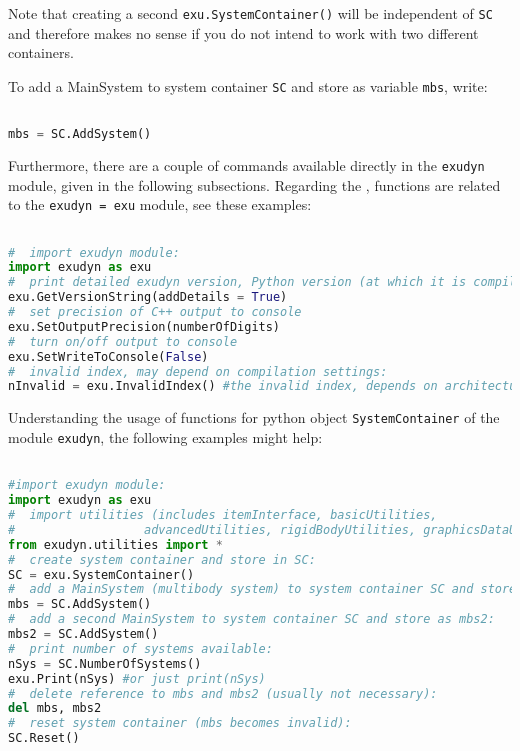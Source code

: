 Note that creating a second \texttt{exu.SystemContainer()} will be independent of \texttt{SC} and therefore makes no sense if you do not intend to work with two different containers.

To add a MainSystem to system container \texttt{SC} and store as variable \texttt{mbs}, write:
\pythonstyle
\begin{lstlisting}[language=Python, firstnumber=1]

mbs = SC.AddSystem()
\end{lstlisting}


Furthermore, there are a couple of commands available directly in the \texttt{exudyn} module, given in the following subsections. Regarding the , functions are related to the \texttt{exudyn = exu} module, see these examples:
\pythonstyle
\begin{lstlisting}[language=Python, firstnumber=1]

#  import exudyn module:
import exudyn as exu
#  print detailed exudyn version, Python version (at which it is compiled):
exu.GetVersionString(addDetails = True)
#  set precision of C++ output to console
exu.SetOutputPrecision(numberOfDigits)
#  turn on/off output to console
exu.SetWriteToConsole(False)
#  invalid index, may depend on compilation settings:
nInvalid = exu.InvalidIndex() #the invalid index, depends on architecture and version
\end{lstlisting}


Understanding the usage of functions for python object \texttt{SystemContainer} of the module \texttt{exudyn}, the following examples might help:
\pythonstyle
\begin{lstlisting}[language=Python, firstnumber=1]

#import exudyn module:
import exudyn as exu
#  import utilities (includes itemInterface, basicUtilities, 
#                  advancedUtilities, rigidBodyUtilities, graphicsDataUtilities):
from exudyn.utilities import *
#  create system container and store in SC:
SC = exu.SystemContainer()
#  add a MainSystem (multibody system) to system container SC and store as mbs:
mbs = SC.AddSystem()
#  add a second MainSystem to system container SC and store as mbs2:
mbs2 = SC.AddSystem()
#  print number of systems available:
nSys = SC.NumberOfSystems()
exu.Print(nSys) #or just print(nSys)
#  delete reference to mbs and mbs2 (usually not necessary):
del mbs, mbs2
#  reset system container (mbs becomes invalid):
SC.Reset()
\end{lstlisting}


